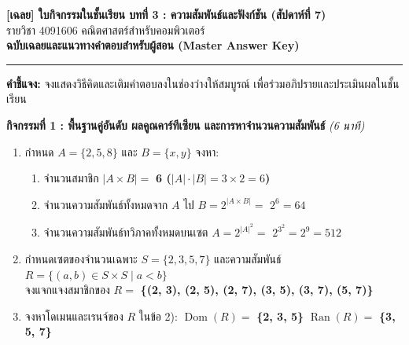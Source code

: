 \documentclass[a4paper,12pt]{article}
\newcommand{\ans}[1]{\textbf{\color{ans}#1}}
\begin{document}
\noindent
\begin{minipage}[c]{0.78\textwidth}
  {\Large\bfseries\color{navy} [เฉลย] ใบกิจกรรมในชั้นเรียน บทที่ 3 : ความสัมพันธ์และฟังก์ชัน (สัปดาห์ที่ 7)}\\[0.1em]
  {\normalsize รายวิชา 4091606 คณิตศาสตร์สำหรับคอมพิวเตอร์}\\[0.5em]
  {\bfseries\color{ans} ฉบับเฉลยและแนวทางคำตอบสำหรับผู้สอน (Master Answer Key)}
\end{minipage}\hfill
\begin{minipage}[c]{0.2\textwidth}
  \centering
\end{minipage}
\par\vspace{0.3em}\hrule\vspace{0.4em}

\noindent\textbf{คำชี้แจง:} จงแสดงวิธีคิดและเติมคำตอบลงในช่องว่างให้สมบูรณ์ เพื่อร่วมอภิปรายและประเมินผลในชั้นเรียน
\vspace{0.3em}

\noindent\textbf{กิจกรรมที่ 1 : พื้นฐานคู่อันดับ ผลคูณคาร์ทีเซียน และการหาจำนวนความสัมพันธ์} \hfill \textit{(6 นาที)}
\begin{enumerate}[label=\arabic*)]
  \item กำหนด $A = \{2, 5, 8\}$ และ $B = \{x, y\}$ จงหา:
        \begin{enumerate}[label=(\alph*),itemsep=2pt]
          \item จำนวนสมาชิก $|A \times B| =$ \ans{6 \quad ($|A| \cdot |B| = 3 \times 2 = 6$)}
          \item จำนวนความสัมพันธ์ทั้งหมดจาก $A$ ไป $B = 2^{|A \times B|} =$ \ans{$2^6 = 64$ }
          \item จำนวนความสัมพันธ์ทวิภาคทั้งหมดบนเซต $A = 2^{|A|^2} =$ \ans{$2^{3^2} = 2^9 = 512$ }
        \end{enumerate}
  \item กำหนดเซตของจำนวนเฉพาะ $S = \{2, 3, 5, 7\}$ และความสัมพันธ์ $R = \{(a, b) \in S \times S \mid a < b\}$\\
        จงแจกแจงสมาชิกของ $R = $ \ans{\{(2, 3), (2, 5), (2, 7), (3, 5), (3, 7), (5, 7)\}}
  \item จงหาโดเมนและเรนจ์ของ $R$ ในข้อ 2):
        \quad $\operatorname{Dom}(R) = $ \ans{\{2, 3, 5\}}
        \quad $\operatorname{Ran}(R) = $ \ans{\{3, 5, 7\}}
\end{enumerate}
\vspace{0.6em}
\end{document}
